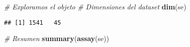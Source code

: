 \documentclass[
]{article}
\newenvironment{Shaded}{\begin{snugshade}}{\end{snugshade}}
\newcommand{\CommentTok}[1]{\textcolor[rgb]{0.56,0.35,0.01}{\textit{#1}}}
\newcommand{\FunctionTok}[1]{\textcolor[rgb]{0.13,0.29,0.53}{\textbf{#1}}}
\newcommand{\NormalTok}[1]{#1}
\begin{document}
\begin{Shaded}
\begin{Highlighting}[]
\CommentTok{\# Exploramos el objeto }
\CommentTok{\# Dimensiones del dataset}
\FunctionTok{dim}\NormalTok{(se)}
\end{Highlighting}
\end{Shaded}

\begin{verbatim}
## [1] 1541   45
\end{verbatim}

\begin{Shaded}
\begin{Highlighting}[]
\CommentTok{\# Resumen}
\FunctionTok{summary}\NormalTok{(}\FunctionTok{assay}\NormalTok{(se))}
\end{Highlighting}
\end{Shaded}
\end{document}
